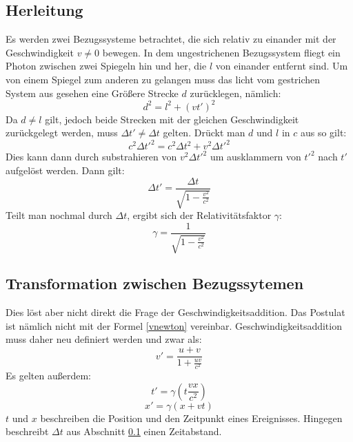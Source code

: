 \documentclass[12pt]{article}
\begin{document}
\subsection{Herleitung}
\label{herl}
Es werden zwei Bezugssysteme betrachtet, die sich relativ zu einander mit der Geschwindigkeit $v \neq 0$ bewegen.
In dem ungestrichenen Bezugssystem fliegt ein Photon zwischen zwei Spiegeln hin und her, die $l$ von einander entfernt sind.
Um von einem Spiegel zum anderen zu gelangen muss das licht vom gestrichen System aus gesehen eine Größere Strecke $d$ zurücklegen, nämlich:
\begin{equation}
d^2 = l^2 + (vt')^2
\end{equation}
Da $d \neq l$ gilt, jedoch beide Strecken mit der gleichen Geschwindigkeit zurückgelegt werden, muss $\Delta t' \neq \Delta t$ gelten.
Drückt man $d$ und $l$ in $c$ aus so gilt:
\begin{equation}
c^2 \Delta t'^2 = c^2 \Delta t^2 + v^2 \Delta t'^2
\end{equation}
Dies kann dann durch substrahieren von $v^2 \Delta t'^2$ um ausklammern von $t'^2$ nach $t'$ aufgelöst werden.
Dann gilt:
\begin{equation}
\Delta t' = \frac{\Delta t}{\sqrt{1-\frac{v^2}{c^2}}}
\end{equation}
Teilt man nochmal durch $\Delta t$, ergibt sich der Relativitätsfaktor $\gamma$:
\begin{equation}
\label{gamma}
\gamma = \frac{1}{\sqrt{1-\frac{v^2}{c^2}}}
\end{equation}
\subsection{Transformation zwischen Bezugssytemen}
Dies löst aber nicht direkt die Frage der Geschwindigkeitsaddition.
Das Postulat ist nämlich nicht mit der Formel \ref{vnewton} vereinbar.
Geschwindigkeitsaddition muss daher neu definiert werden und zwar als:
\begin{equation}
v' = \frac{u + v}{1 + \frac{uv}{c^2}}
\end{equation}
Es gelten außerdem:
\begin{equation}
t' = \gamma(t \frac{vx}{c^2})
\end{equation}
\begin{equation}
x' = \gamma(x + vt)
\end{equation}
$t$ und $x$ beschreiben die Position und den Zeitpunkt eines Ereignisses.
Hingegen beschreibt $\Delta t$ aus Abschnitt \ref{herl} einen Zeitabstand.
\end{document}
